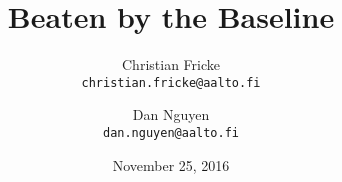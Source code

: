 
\title{Beaten by the Baseline}

\author{
  \large Christian Fricke\\[-.2em]
  \texttt{\normalsize christian.fricke@aalto.fi}
  \and
  \large Dan Nguyen\\[-.2em]
  \texttt{\normalsize dan.nguyen@aalto.fi}
}

\date{\large November 25, 2016}

\maketitle

